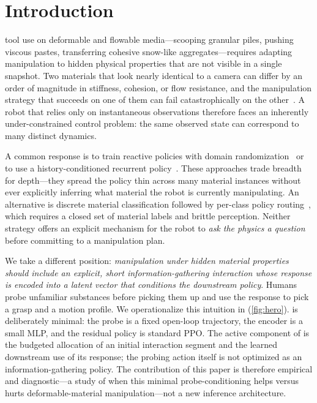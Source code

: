 \section{Introduction}
\label{sec:introduction}

 tool use on deformable and flowable media---scooping granular piles, pushing viscous pastes, transferring cohesive snow-like aggregates---requires adapting manipulation to hidden physical properties that are not visible in a single snapshot. Two materials that look nearly identical to a camera can differ by an order of magnitude in stiffness, cohesion, or flow resistance, and the manipulation strategy that succeeds on one of them can fail catastrophically on the other~\cite{huang2022plasticinelab,lin2022diffskill,shi2023robocook}. A robot that relies only on instantaneous observations therefore faces an inherently under-constrained control problem: the same observed state can correspond to many distinct dynamics.

A common response is to train reactive policies with domain randomization~\cite{tobin2017domain,peng2018sim2real} or to use a history-conditioned recurrent policy~\cite{hausman2018learning,xie2018learning}. These approaches trade breadth for depth---they spread the policy thin across many material instances without ever explicitly inferring what material the robot is currently manipulating. An alternative is discrete material classification followed by per-class policy routing~\cite{calandra2018more}, which requires a closed set of material labels and brittle perception. Neither strategy offers an explicit mechanism for the robot to \emph{ask the physics a question} before committing to a manipulation plan.

We take a different position: \emph{manipulation under hidden material properties should include an explicit, short information-gathering interaction whose response is encoded into a latent vector that conditions the downstream policy}. Humans probe unfamiliar substances before picking them up and use the response to pick a grasp and a motion profile. We operationalize this intuition in \PTA{} (\cref{fig:hero}). \PTA{} is deliberately minimal: the probe is a fixed open-loop trajectory, the encoder is a small MLP, and the residual policy is standard PPO. The active component of \PTA{} is the budgeted allocation of an initial interaction segment and the learned downstream use of its response; the probing action itself is not optimized as an information-gathering policy. The contribution of this paper is therefore empirical and diagnostic---a study of when this minimal probe-conditioning helps versus hurts deformable-material manipulation---not a new inference architecture.

